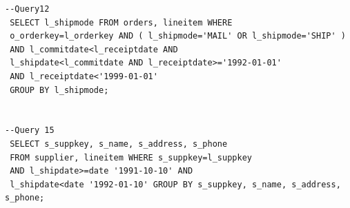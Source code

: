 \begin{toappendix}
\begin{verbatim}
--Query12
 SELECT l_shipmode FROM orders, lineitem WHERE
 o_orderkey=l_orderkey AND ( l_shipmode='MAIL' OR l_shipmode='SHIP' )
 AND l_commitdate<l_receiptdate AND
 l_shipdate<l_commitdate AND l_receiptdate>='1992-01-01'
 AND l_receiptdate<'1999-01-01'
 GROUP BY l_shipmode;


--Query 15
 SELECT s_suppkey, s_name, s_address, s_phone
 FROM supplier, lineitem WHERE s_suppkey=l_suppkey
 AND l_shipdate>=date '1991-10-10' AND
 l_shipdate<date '1992-01-10' GROUP BY s_suppkey, s_name, s_address, s_phone;
                    \end{verbatim}


\end{toappendix}
